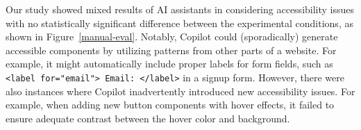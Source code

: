 
Our study showed mixed results of AI assistants in considering accessibility issues with no statistically significant difference between the experimental conditions, as shown in Figure~\ref{manual-eval}. Notably, Copilot could (sporadically) generate accessible components by utilizing patterns from other parts of a website. For example, it might automatically include proper labels for form fields, such as \colorbox{codebgd}{\texttt{<label for="email"> Email: </label>}} in a signup form. However, there were also instances where Copilot inadvertently introduced new accessibility issues. For example, when adding new button components with hover effects, it failed to ensure adequate contrast between the hover color and background. 

